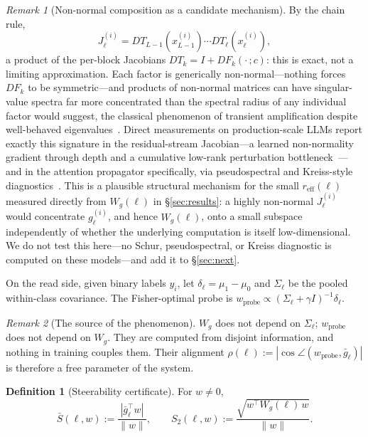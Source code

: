 \documentclass[11pt]{article}
\theoremstyle{definition}
\newtheorem{definition}{Definition}
\theoremstyle{remark}
\newtheorem{remark}{Remark}
\newcommand{\Sbar}{\bar{S}}
\newcommand{\gbar}{\bar{g}}
\newcommand{\Wg}{W_{g}}
\newcommand{\reff}{r_{\mathrm{eff}}}
\begin{document}
\begin{remark}[Non-normal composition as a candidate mechanism]
\label{rem:nonnormal}
By the chain rule,
\[
J_\ell^{(i)} = DT_{L-1}(x_{L-1}^{(i)})\cdots DT_\ell(x_\ell^{(i)}),
\]
a product of the per-block Jacobians $DT_k=I+DF_k(\cdot\,;c)$: this is exact, not
a limiting approximation. Each factor is generically non-normal---nothing forces
$DF_k$ to be symmetric---and products of non-normal matrices can have
singular-value spectra far more concentrated than the spectral radius of any
individual factor would suggest, the classical phenomenon of transient
amplification despite well-behaved eigenvalues~\cite{trefethen1993}. Direct
measurements on production-scale LLMs report exactly this signature in the
residual-stream Jacobian---a learned non-normality gradient through depth and a
cumulative low-rank perturbation bottleneck~\cite{nonnormalresidual2026}---and in
the attention propagator specifically, via pseudospectral and Kreiss-style
diagnostics~\cite{transientreserves2026}. This is a plausible structural
mechanism for the small $\reff(\ell)$ measured directly from $\Wg(\ell)$ in
\S\ref{sec:results}: a highly non-normal $J_\ell^{(i)}$ would concentrate
$g_\ell^{(i)}$, and hence $\Wg(\ell)$, onto a small subspace independently of
whether the underlying computation is itself low-dimensional. We do not test
this here---no Schur, pseudospectral, or Kreiss diagnostic is computed on these
models---and add it to \S\ref{sec:next}.
\end{remark}

On the read side, given binary labels $y_i$, let $\delta_\ell=\mu_1-\mu_0$ and
$\Sigma_\ell$ be the pooled within-class covariance. The Fisher-optimal probe is
$w_{\mathrm{probe}} \propto (\Sigma_\ell+\gamma I)^{-1}\delta_\ell$.

\begin{remark}[The source of the phenomenon]
$\Wg$ does not depend on $\Sigma_\ell$; $w_{\mathrm{probe}}$ does not depend on
$\Wg$. They are computed from disjoint information, and nothing in training
couples them. Their alignment
$\rho(\ell) := |\cos\angle(w_{\mathrm{probe}},\gbar_\ell)|$ is therefore a free
parameter of the system.
\end{remark}

\begin{definition}[Steerability certificate]
For $w\neq 0$,
\begin{equation}
\Sbar(\ell,w) := \frac{|\gbar_\ell^\top w|}{\|w\|},
\qquad
S_2(\ell,w) := \frac{\sqrt{w^\top \Wg(\ell)\, w}}{\|w\|}.
\end{equation}
\end{definition}
\end{document}
